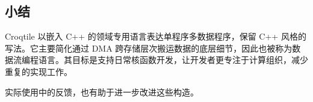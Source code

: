 \subsection*{小结}

Croqtile 以嵌入 C++ 的领域专用语言表达单程序多数据程序，保留 C++ 风格的写法。它主要简化通过 DMA 跨存储层次搬运数据的底层细节，因此也被称为数据流编程语言。其目标是支持日常核函数开发，让开发者更专注于计算组织，减少重复的实现工作。

实际使用中的反馈，也有助于进一步改进这些构造。
